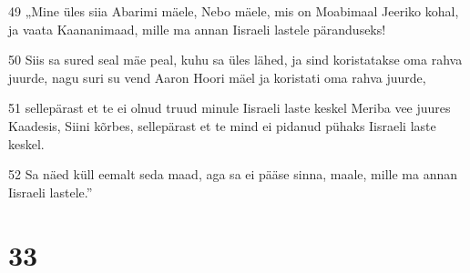 \par 49 „Mine üles siia Abarimi mäele, Nebo mäele, mis on Moabimaal Jeeriko kohal, ja vaata Kaananimaad, mille ma annan Iisraeli lastele päranduseks!
\par 50 Siis sa sured seal mäe peal, kuhu sa üles lähed, ja sind koristatakse oma rahva juurde, nagu suri su vend Aaron Hoori mäel ja koristati oma rahva juurde,
\par 51 sellepärast et te ei olnud truud minule Iisraeli laste keskel Meriba vee juures Kaadesis, Siini kõrbes, sellepärast et te mind ei pidanud pühaks Iisraeli laste keskel.
\par 52 Sa näed küll eemalt seda maad, aga sa ei pääse sinna, maale, mille ma annan Iisraeli lastele.”

\chapter{33}

